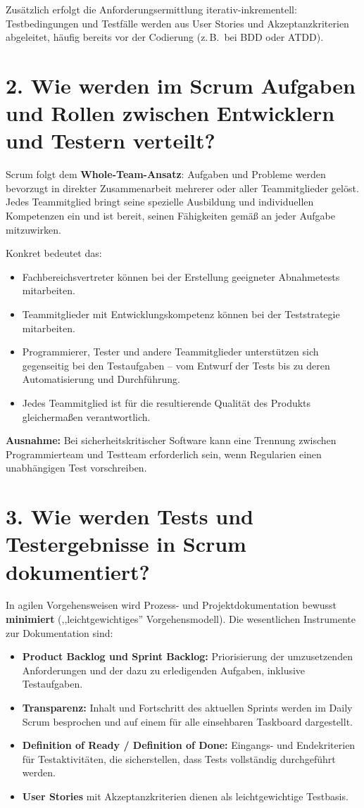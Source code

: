 \documentclass[
	fontsize=12pt,          %
	paper=a4,               %
	numbers=noenddot,       %
	listof=totoc,           %
	listof=entryprefix,     %
	listof=nochaptergap,    %
	bibliography=totoc,     %
	parskip=half,           %
	openany                 %
]{scrbook}
\begin{document}
Zusätzlich erfolgt die Anforderungsermittlung iterativ-inkrementell: Testbedingungen und Testfälle werden aus User Stories und Akzeptanzkriterien abgeleitet, häufig bereits vor der Codierung (z.\,B.\ bei BDD oder ATDD).


\section*{2. Wie werden im Scrum Aufgaben und Rollen zwischen Entwicklern und Testern verteilt?}

Scrum folgt dem \textbf{Whole-Team-Ansatz}: Aufgaben und Probleme werden bevorzugt in direkter Zusammenarbeit mehrerer oder aller Teammitglieder gelöst.
Jedes Teammitglied bringt seine spezielle Ausbildung und individuellen Kompetenzen ein und ist bereit, seinen Fähigkeiten gemäß an jeder Aufgabe mitzuwirken.

Konkret bedeutet das:
\begin{itemize}
	\item Fachbereichsvertreter können bei der Erstellung geeigneter Abnahmetests mitarbeiten.
	\item Teammitglieder mit Entwicklungskompetenz können bei der Teststrategie mitarbeiten.
	\item Programmierer, Tester und andere Teammitglieder unterstützen sich gegenseitig bei den Testaufgaben -- vom Entwurf der Tests bis zu deren Automatisierung und Durchführung.
	\item Jedes Teammitglied ist für die resultierende Qualität des Produkts gleichermaßen verantwortlich.
\end{itemize}

\textbf{Ausnahme:} Bei sicherheitskritischer Software kann eine Trennung zwischen Programmierteam und Testteam erforderlich sein, wenn Regularien einen unabhängigen Test vorschreiben.


\section*{3. Wie werden Tests und Testergebnisse in Scrum dokumentiert?}

In agilen Vorgehensweisen wird Prozess- und Projektdokumentation bewusst \textbf{minimiert} (,,leichtgewichtiges'' Vorgehensmodell).
Die wesentlichen Instrumente zur Dokumentation sind:
\begin{itemize}
	\item \textbf{Product Backlog und Sprint Backlog:} Priorisierung der umzusetzenden Anforderungen und der dazu zu erledigenden Aufgaben, inklusive Testaufgaben.
	\item \textbf{Transparenz:} Inhalt und Fortschritt des aktuellen Sprints werden im Daily Scrum besprochen und auf einem für alle einsehbaren Taskboard dargestellt.
	\item \textbf{Definition of Ready / Definition of Done:} Eingangs- und Endekriterien für Testaktivitäten, die sicherstellen, dass Tests vollständig durchgeführt werden.
	\item \textbf{User Stories} mit Akzeptanzkriterien dienen als leichtgewichtige Testbasis.
\end{itemize}
\end{document}
